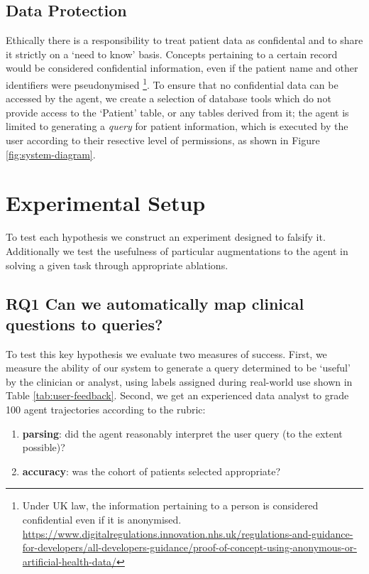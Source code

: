 \documentclass[11pt]{article}
\begin{document}
\subsection{Data Protection} 
Ethically there is a responsibility to treat patient data as confidental and to share it strictly on a `need to know' basis.
Concepts pertaining to a certain record would be considered confidential information, even if the patient name and other identifiers were pseudonymised
\footnote{Under UK law, the information pertaining to a person is considered confidential even if it is anonymised.
\url{https://www.digitalregulations.innovation.nhs.uk/regulations-and-guidance-for-developers/all-developers-guidance/proof-of-concept-using-anonymous-or-artificial-health-data/}
}. 
To ensure that no confidential data can be accessed by the agent, we create a selection of database tools which do not provide access to the `Patient' table, or any tables derived from it; the agent is limited to generating a \textit{query} for patient information, which is executed by the user according to their resective level of permissions, as shown in Figure \ref{fig:system-diagram}.


\section{Experimental Setup}
To test each hypothesis we construct an experiment designed to falsify it.
Additionally we test the usefulness of particular augmentations to the agent in solving a given task through appropriate ablations.

\subsection*{RQ1 Can we automatically map clinical questions to queries?}

To test this key hypothesis we evaluate two measures of success.
First, we measure the ability of our system to generate a query determined to be `useful' by the clinician or analyst, using labels assigned during real-world use shown in Table \ref{tab:user-feedback}.
Second, we get an experienced data analyst to grade 100 agent trajectories according to the rubric:
\begin{enumerate}
	\item \textbf{parsing}: did the agent reasonably interpret the user query (to the extent possible)?
	\item \textbf{accuracy}: was the cohort of patients selected appropriate? 
\end{enumerate}
\end{document}
